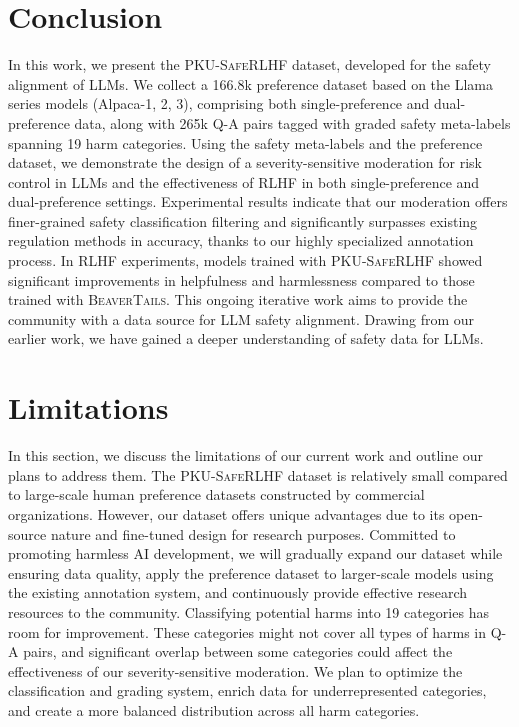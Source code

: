 \documentclass[11pt]{article}
\theoremstyle{plain}
\theoremstyle{definition}
\theoremstyle{remark}
\newcommand{\db}{\textsc{PKU-SafeRLHF}}
\begin{document}
\section{Conclusion}
\label{sec:conclusion}
In this work, we present the \db{} dataset, developed for the safety alignment of LLMs.
We collect a 166.8k preference dataset based on the Llama series models (Alpaca-1, 2, 3), comprising both single-preference and dual-preference data, along with 265k Q-A pairs tagged with graded safety meta-labels spanning 19 harm categories.
Using the safety meta-labels and the preference dataset, we demonstrate the design of a severity-sensitive moderation for risk control in LLMs and the effectiveness of RLHF in both single-preference and dual-preference settings.
Experimental results indicate that our moderation offers finer-grained safety classification filtering and significantly surpasses existing regulation methods in accuracy, thanks to our highly specialized annotation process.
In RLHF experiments, models trained with \db{} showed significant improvements in helpfulness and harmlessness compared to those trained with \textsc{BeaverTails}.
This ongoing iterative work aims to provide the community with a data source for LLM safety alignment. Drawing from our earlier work, we have gained a deeper understanding of safety data for LLMs.


\section{Limitations}
\label{sec:limitation_and_future_work}
In this section, we discuss the limitations of our current work and outline our plans to address them. The \db{} dataset is relatively small compared to large-scale human preference datasets constructed by commercial organizations. However, our dataset offers unique advantages due to its open-source nature and fine-tuned design for research purposes. Committed to promoting harmless AI development, we will gradually expand our dataset while ensuring data quality, apply the preference dataset to larger-scale models using the existing annotation system, and continuously provide effective research resources to the community. Classifying potential harms into 19 categories has room for improvement. These categories might not cover all types of harms in Q-A pairs, and significant overlap between some categories could affect the effectiveness of our severity-sensitive moderation. We plan to optimize the classification and grading system, enrich data for underrepresented categories, and create a more balanced distribution across all harm categories.
\end{document}
